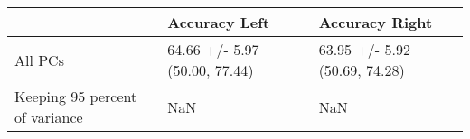 \begin{tabular}{lll}
\toprule
{} &                  Accuracy Left &                 Accuracy Right \\
\midrule
All PCs                        &  64.66 +/- 5.97 (50.00, 77.44) &  63.95 +/- 5.92 (50.69, 74.28) \\
Keeping 95 percent of variance &                            NaN &                            NaN \\
\bottomrule
\end{tabular}
